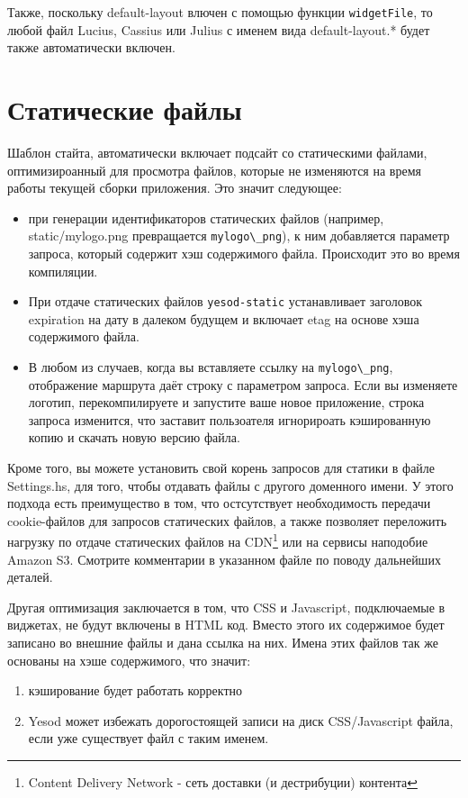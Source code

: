 Также, поскольку default-layout влючен с помощью функции \lstinline!widgetFile!, то любой
файл Lucius, Cassius или Julius с именем вида default-layout.* будет также автоматически включен.

\section{Статические файлы}

Шаблон стайта, автоматически включает подсайт со статическими файлами, оптимизироанный для просмотра
файлов, которые не изменяются на время работы текущей сборки приложения. Это значит следующее:

\begin{itemize}
  \item при генерации идентификаторов статических файлов (например, static/mylogo.png
    превращается  \lstinline!mylogo\_png!), к ним добавляется параметр запроса, который содержит
    хэш содержимого файла. Происходит это во время компиляции.
  \item При отдаче статических файлов \lstinline!yesod-static! устанавливает заголовок expiration
    на дату в далеком будущем и включает etag на основе хэша содержимого файла.
  \item В любом из случаев, когда вы вставляете  ссылку на \lstinline!mylogo\_png!, отображение
    маршрута даёт строку с параметром запроса. Если вы изменяете логотип, перекомпилируете и
    запустите ваше новое приложение, строка запроса изменится, что заставит пользоателя игнорироать
    кэшированную копию и скачать новую версию файла.
\end{itemize}

Кроме того, вы можете установить свой корень запросов для статики в файле Settings.hs, для того, чтобы
отдавать файлы  с другого доменного имени. У этого подхода есть преимущество в том, что остсутствует
необходимость передачи cookie-файлов для запросов статических файлов, а также позволяет переложить
нагрузку по отдаче статических файлов на CDN\footnote{Content Delivery Network - сеть доставки (и
дестрибуции) контента} или на сервисы наподобие Amazon S3. Смотрите комментарии в указанном файле
по поводу дальнейших деталей.

Другая оптимизация заключается в том, что CSS и Javascript, подключаемые в виджетах, не будут
включены в HTML код. Вместо этого их содержимое будет записано во внешние файлы и дана ссылка на них.
Имена этих файлов так же основаны на хэше содержимого, что значит:
\begin{enumerate}
  \item кэширование будет работать корректно
  \item Yesod может избежать дорогостоящей записи на диск CSS/Javascript файла, если уже существует
    файл с таким именем.
\end{enumerate}

